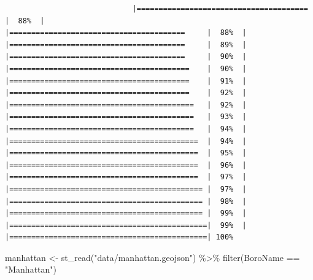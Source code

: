 \documentclass[
  krantz2]{krantz}
\makeatletter
\newenvironment{Shaded}{\begin{snugshade}}{\end{snugshade}}
\newcommand{\FunctionTok}[1]{\textcolor[rgb]{0,0,0}{#1}}
\newcommand{\NormalTok}[1]{#1}
\newcommand{\OtherTok}[1]{\textcolor[rgb]{0.37,0.37,0.37}{#1}}
\newcommand{\SpecialCharTok}[1]{\textcolor[rgb]{0,0,0}{#1}}
\newcommand{\StringTok}[1]{\textcolor[rgb]{0.5,0.5,0.5}{#1}}
\newenvironment{kframe}{%
\medskip{}
\setlength{\fboxsep}{.8em}
 \def\at@end@of@kframe{}%
 \ifinner\ifhmode%
  \def\at@end@of@kframe{\end{minipage}}%
  \begin{minipage}{\columnwidth}%
 \fi\fi%
 \def\FrameCommand##1{\hskip\@totalleftmargin \hskip-\fboxsep
 \colorbox{shadecolor}{##1}\hskip-\fboxsep
     \hskip-\linewidth \hskip-\@totalleftmargin \hskip\columnwidth}%
 \MakeFramed {\advance\hsize-\width
   \@totalleftmargin\z@ \linewidth\hsize
   \@setminipage}}%
 {\par\unskip\endMakeFramed%
 \at@end@of@kframe}
\renewenvironment{Shaded}{\begin{kframe}}{\end{kframe}}
\makeatother
\begin{document}
\begin{verbatim}
                             |=======================================      |  88%  |                                                     |========================================     |  88%  |                                                     |========================================     |  89%  |                                                     |========================================     |  90%  |                                                     |=========================================    |  90%  |                                                     |=========================================    |  91%  |                                                     |=========================================    |  92%  |                                                     |==========================================   |  92%  |                                                     |==========================================   |  93%  |                                                     |==========================================   |  94%  |                                                     |===========================================  |  94%  |                                                     |===========================================  |  95%  |                                                     |===========================================  |  96%  |                                                     |===========================================  |  97%  |                                                     |============================================ |  97%  |                                                     |============================================ |  98%  |                                                     |============================================ |  99%  |                                                     |=============================================|  99%  |                                                     |=============================================| 100%
\end{verbatim}

\begin{Shaded}
\begin{Highlighting}[]
\NormalTok{manhattan }\OtherTok{\textless{}{-}} \FunctionTok{st\_read}\NormalTok{(}\StringTok{"data/manhattan.geojson"}\NormalTok{) }\SpecialCharTok{\%\textgreater{}\%}
  \FunctionTok{filter}\NormalTok{(BoroName }\SpecialCharTok{==} \StringTok{"Manhattan"}\NormalTok{)}
\end{Highlighting}
\end{Shaded}
\end{document}
